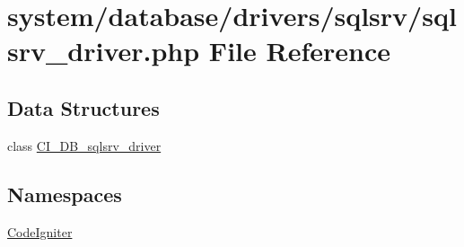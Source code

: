 \hypertarget{sqlsrv__driver_8php}{}\section{system/database/drivers/sqlsrv/sqlsrv\+\_\+driver.php File Reference}
\label{sqlsrv__driver_8php}
\subsection*{Data Structures}
\begin{DoxyCompactItemize}
\item 
class \mbox{\hyperlink{class_c_i___d_b__sqlsrv__driver}{C\+I\+\_\+\+D\+B\+\_\+sqlsrv\+\_\+driver}}
\end{DoxyCompactItemize}
\subsection*{Namespaces}
\begin{DoxyCompactItemize}
\item 
 \mbox{\hyperlink{namespace_code_igniter}{Code\+Igniter}}
\end{DoxyCompactItemize}
